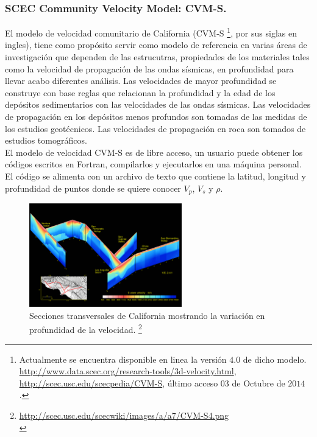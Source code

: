 \begin{frame}[allowframebreaks]
\frametitle{SCEC Community Velocity Model: CVM-S.}
%
\justifying
%
El modelo de velocidad comunitario de California (CVM-S \footnote{ \tiny Actualmente se encuentra disponible en linea la versión $4.0$ de dicho modelo. \url{http://www.data.scec.org/research-tools/3d-velocity.html}, \url{http://scec.usc.edu/scecpedia/CVM-S}, último acceso $03$ de Octubre de $2014$.}, por sus siglas en ingles), tiene como propósito servir como modelo de referencia en varias áreas de investigación que dependen de las estrucutras, propiedades de los materiales tales como la velocidad de propagación de las ondas sísmicas, en profundidad para llevar acabo diferentes análisis. Las velocidades de mayor profundidad se construye con base reglas que relacionan la profundidad y la edad de los depósitos sedimentarios con las velocidades de las ondas sísmicas. Las velocidades de propagación en los depósitos menos profundos son tomadas de las medidas de los estudios geotécnicos. Las velocidades de propagación en roca son tomados de estudios tomográficos.\\
%
El modelo de velocidad CVM-S es de libre acceso, un usuario puede obtener los códigos escritos en Fortran, compilarlos y ejecutarlos en una máquina personal. El código se alimenta con un archivo de texto que contiene la latitud, longitud y profundidad de puntos donde se quiere conocer $V_p$, $V_s$ y $\rho$.
%
%
\begin{figure}[h]
	\centering
	\includegraphics[height=4.5cm]{img/CVM-S4.pdf}
	\caption{Secciones transversales de California mostrando la variación en profundidad de la velocidad. \footnote{\tiny \url{http://scec.usc.edu/scecwiki/images/a/a7/CVM-S4.png}\\}}
	\vspace{-.5 cm}
\end{figure}
%
\end{frame}
%
%
